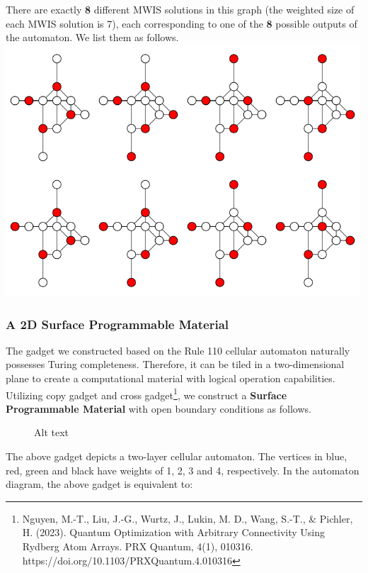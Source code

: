 \documentclass[twocolumn,superscriptaddress,english,showpacs,longbibliography]{revtex4-2}
\begin{document}
There are exactly \textbf{8} different MWIS solutions in this graph (the
weighted size of each MWIS solution is 7), each corresponding to one of
the \textbf{8} possible outputs of the automaton. We list them as
follows.
\includegraphics[width=5.20833in,height=\textheight,keepaspectratio]{../notes/images/gadget110.png}

\subsubsection{A 2D Surface Programmable
Material}\label{a-2d-surface-programmable-material}

The gadget we constructed based on the Rule 110 cellular automaton
naturally possesses Turing completeness. Therefore, it can be tiled in a
two-dimensional plane to create a computational material with logical
operation capabilities. Utilizing copy gadget and cross
gadget\footnote{Nguyen, M.-T., Liu, J.-G., Wurtz, J., Lukin, M. D.,
  Wang, S.-T., \& Pichler, H. (2023). Quantum Optimization with
  Arbitrary Connectivity Using Rydberg Atom Arrays. PRX Quantum, 4(1),
  010316. https://doi.org/10.1103/PRXQuantum.4.010316}, we construct a
\textbf{Surface Programmable Material} with open boundary conditions as
follows.

\begin{figure}
\centering
%
\caption{Alt text}
\end{figure}

The above gadget depicts a two-layer cellular automaton. The vertices in
blue, red, green and black have weights of 1, 2, 3 and 4, respectively.
In the automaton diagram, the above gadget is equivalent to:
\end{document}

